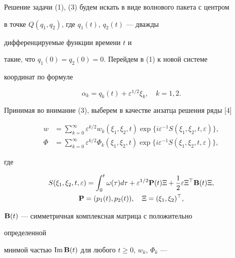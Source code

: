  


Решение задачи (1), (3) будем искать в виде волнового пакета с центром 


в точке $Q(q_1,q_2)$, где $q_1(t)$, $q_2(t)$ --- дважды


дифференцируемые функции времени $t$ и 


такие, что $q_1(0)=q_2(0)=0$. Перейдем в (1) к новой системе 


координат по формуле 


\begin{equation} 


\alpha_k=q_k(t)+\varepsilon^{1/2}\xi_k,\quad k=1,2. 


\end{equation} 


Принимая во внимание (3), выберем в качестве анзатца решения ряды [4] 


\begin{equation} 


\begin{split} 


w&=\sum^\infty_{k=0}\varepsilon^{k/2}w_k(\xi_1,\xi_2,t) 


\exp\{i\varepsilon^{-1}S(\xi_1,\xi_2,t,\varepsilon)\},\\ 


\Phi&=\sum^\infty_{k=0}\varepsilon^{k/2}\Phi_k(\xi_1,\xi_2,t) 


\exp\{i\varepsilon^{-1}S(\xi_1,\xi_2,t,\varepsilon)\}, 


\end{split} 


\end{equation} 


где 


\begin{gather} 


S(\xi_1,\xi_2,t,\varepsilon)=\int^t_0 \omega(\tau)d\tau+ 


\varepsilon^{1/2}\BP(t)\Xi+\frac{1}{2}\varepsilon\Xi^\top 


\BB(t)\Xi,\\ 


\BP=(p_1(t),p_2(t)),\quad \Xi=(\xi_1,\xi_2)^\top,\notag 


\end{gather} 


$\bold B(t)$ --- симметричная комплексная матрица с положительно 


определенной 


мнимой частью $\operatorname{Im}\bold B(t)$ для любого $t\ge 0$, $w_k$, $\Phi_k$ --- 


